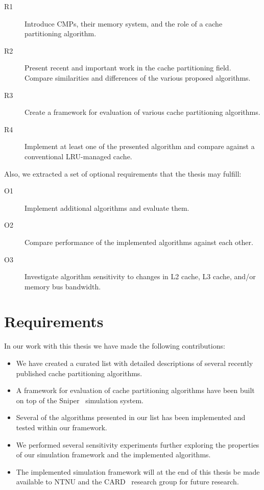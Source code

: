 \begin{description}
    \item[R1] Introduce CMPs, their memory system, and the role of a cache partitioning algorithm.
    \item[R2] Present recent and important work in the cache partitioning field. Compare similarities and differences of the various proposed algorithms.
    \item[R3] Create a framework for evaluation of various cache partitioning algorithms.
    \item[R4] Implement at least one of the presented algorithm and compare against a conventional LRU-managed cache.
\end{description}

Also, we extracted a set of optional requirements that the thesis may fulfill:

\begin{description}
    \item[O1] Implement additional algorithms and evaluate them.
    \item[O2] Compare performance of the implemented algorithms against each other.
    \item[O3] Investigate algorithm sensitivity to changes in L2 cache, L3 cache, and/or memory bus bandwidth.
\end{description}

\section{Requirements}

In our work with this thesis we have made the following contributions:

\begin{itemize}
  \item We have created a curated list with detailed descriptions of several recently published cache partitioning algorithms.
  \item A framework for evaluation of cache partitioning algorithms have been built on top of the Sniper~\cite{Carlson2011a} simulation system.
  \item Several of the algorithms presented in our list has been implemented and tested within our framework.
  \item We performed several sensitivity experiments further exploring the properties of our simulation framework and the implemented algorithms.
  \item The implemented simulation framework will at the end of this thesis be made available to NTNU and the CARD~\cite{CARD2015} research group for future research.
\end{itemize}

